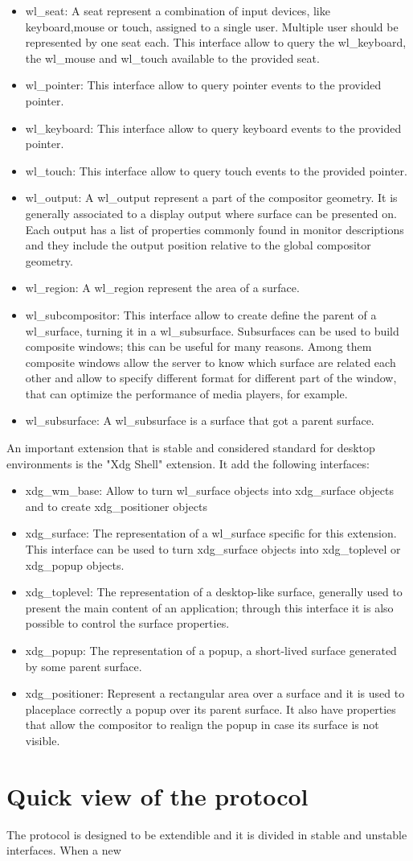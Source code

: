 \begin{itemize}
	\item wl\_seat: A seat represent a combination of input devices, like keyboard,mouse or touch, assigned to a single user. Multiple user should be represented by one seat each. This interface allow to query the wl\_keyboard, the wl\_mouse and wl\_touch available to the provided seat.
	\item wl\_pointer: This interface allow to query pointer events to the provided pointer.
	\item wl\_keyboard: This interface allow to query keyboard events to the provided pointer.
	\item wl\_touch: This interface allow to query touch events to the provided pointer.
	\item wl\_output: A wl\_output represent a part of the compositor geometry. It is generally associated to a display output where surface can be presented on. Each output has a list of properties commonly found in monitor descriptions and they include the output position relative to the global compositor geometry.
	\item wl\_region: A wl\_region represent the area of a surface.
	\item wl\_subcompositor: This interface allow to create define the parent of a wl\_surface, turning it in a wl\_subsurface. Subsurfaces can be used to build composite windows; this can be useful for many reasons. Among them composite windows allow the server to know which surface are related each other and allow to specify different format for different part of the window, that can optimize the performance of media players, for example.
	\item wl\_subsurface: A wl\_subsurface is a surface that got a parent surface.
\end{itemize}
An important extension that is stable and considered standard for desktop environments is the "Xdg Shell" extension. It add the following interfaces: 
\begin{itemize}
	\item xdg\_wm\_base: Allow to turn wl\_surface objects into xdg\_surface objects and to create xdg\_positioner objects
	\item xdg\_surface: The representation of a wl\_surface specific for this extension. This interface can be used to turn xdg\_surface objects into xdg\_toplevel or xdg\_popup objects.
	\item xdg\_toplevel: The representation of a desktop-like surface, generally used to present the main content of an application; through this interface it is also possible to control the surface properties.
	\item xdg\_popup: The representation of a popup, a short-lived surface generated by some parent surface.
	\item xdg\_positioner: Represent a rectangular area over a surface and it is used to placeplace correctly a popup over its parent surface. It also have properties that allow the compositor to realign the popup in case its surface is not visible.
\end{itemize}

\section{Quick view of the protocol}
The protocol is designed to be extendible and it is divided in stable and unstable interfaces. When a new